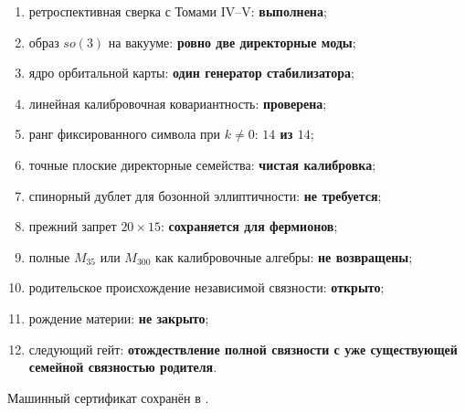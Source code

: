 \begin{protocol}
\begin{enumerate}
 \item ретроспективная сверка с Томами IV--V: \textbf{выполнена};
 \item образ $so(3)$ на вакууме: \textbf{ровно две директорные моды};
 \item ядро орбитальной карты: \textbf{один генератор стабилизатора};
 \item линейная калибровочная ковариантность: \textbf{проверена};
 \item ранг фиксированного символа при $k\ne0$: \textbf{$14$ из $14$};
 \item точные плоские директорные семейства: \textbf{чистая калибровка};
 \item спинорный дублет для бозонной эллиптичности: \textbf{не требуется};
 \item прежний запрет $20\times15$: \textbf{сохраняется для фермионов};
 \item полные $M_{35}$ или $M_{300}$ как калибровочные алгебры:
 \textbf{не возвращены};
 \item родительское происхождение независимой связности: \textbf{открыто};
 \item рождение материи: \textbf{не закрыто};
 \item следующий гейт: \textbf{отождествление полной связности с уже
 существующей семейной связностью родителя}.
\end{enumerate}
\end{protocol}

Машинный сертификат сохранён в
.